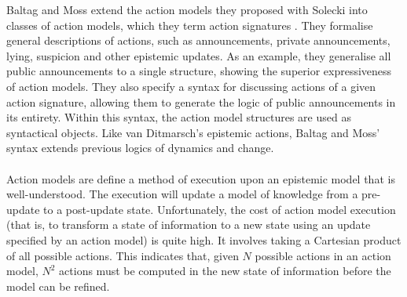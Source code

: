 \documentclass[12pt, a4paper, titlepage]{scrartcl}
\begin{document}
Baltag and Moss extend the action models they proposed with Solecki into classes
of action models, which they term action signatures \cite{baltag2005programs}.
They formalise general descriptions of actions, such as announcements, private
announcements, lying, suspicion and other epistemic updates.
As an example, they generalise all public announcements to a single structure,
showing the superior expressiveness of action models.
They also specify a syntax for discussing actions of a given action signature,
allowing them to generate the logic of public announcements in its entirety.
Within this syntax, the action model structures are used as syntactical objects.
Like van Ditmarsch's epistemic actions, Baltag and Moss' syntax extends previous
logics of dynamics and change.\\
\\
Action models are define a method of execution upon an epistemic model that is well-understood.
The execution will update a model of knowledge from a pre-update to a
post-update state.
Unfortunately, the cost of action model execution (that is, to transform a state
of information to a new state using an update specified by an action model) is
quite high.
It involves taking a Cartesian product of all possible actions.
This indicates that, given $N$ possible actions in an action model, $N^2$
actions must be computed in the new state of information before the model can
be refined.
\end{document}
